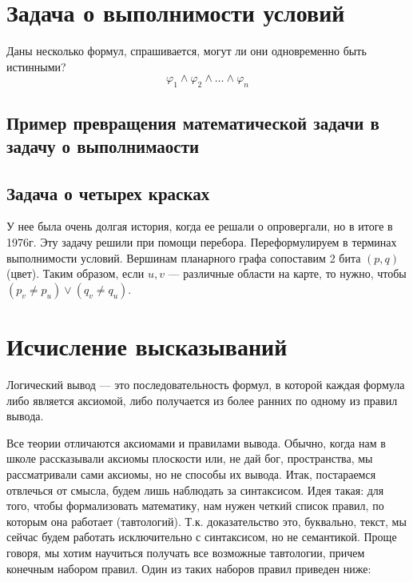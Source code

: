 \section{Задача о выполнимости условий}
Даны несколько формул, спрашивается, могут ли они одновременно быть истинными? 
$$\varphi_1 \wedge \varphi_2 \wedge \dots \wedge \varphi_n$$
\subsection{Пример превращения математической задачи в задачу о выполнимаости}
\subsection{Задача о четырех красках}
У нее была очень долгая история, когда ее решали о опровергали, но в итоге в 1976г. Эту задачу решили при помощи перебора. Переформулируем в терминах выполнимости условий. Вершинам планарного графа сопоставим 2 бита $(p, q)$ (цвет). Таким образом, если $u, v$ --- различные области на карте, то нужно, чтобы $(p_v \neq p_u) \vee (q_v \neq q_u)$.

\section{Исчисление высказываний}
\begin{definition}
    Логический вывод --- это последовательность формул, в которой каждая формула либо является аксиомой, либо получается из более ранних по одному из правил вывода.
\end{definition}

Все теории отличаются аксиомами и правилами вывода. Обычно, когда нам в школе рассказывали аксиомы плоскости или, не дай бог, пространства, мы рассматривали сами аксиомы, но не способы их вывода. Итак, постараемся отвлечься от смысла, будем лишь наблюдать за синтаксисом. Идея такая: для того, чтобы формализовать математику, нам нужен четкий список правил, по которым она работает (тавтологий). Т.к. доказательство это, буквально, текст, мы сейчас будем работать исключительно с синтаксисом, но не семантикой. Проще говоря, мы хотим научиться получать все возможные тавтологии, причем конечным набором правил. Один из таких наборов правил приведен ниже:

